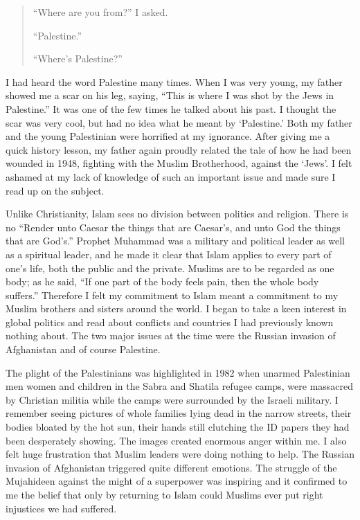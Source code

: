 \documentclass[12pt]{memoir}
\begin{document}
\begin{quote}
“Where are you from?” I asked.

“Palestine.”

“Where’s Palestine?”
\end{quote}

I had heard the word Palestine many times.
When I was very young, my father showed me a scar on his leg, saying,
“This is where I was shot by the Jews in Palestine.”
It was one of the few times he talked about his past.
I thought the scar was very cool,
but had no idea what he meant by ‘Palestine.’
Both my father and the young Palestinian were horrified at my ignorance.
After giving me a quick history lesson,
my father again proudly related the tale of how he had been wounded in 1948,
fighting with the Muslim Brotherhood, against the ‘Jews’.
I felt ashamed at my lack of knowledge of such an important issue
and made sure I read up on the subject.

Unlike Christianity, Islam sees no division between politics and religion.
There is no “Render unto Caesar the things that are Caesar’s,
and unto God the things that are God’s.”
Prophet Muhammad was a military and political leader
as well as a spiritual leader,
and he made it clear that Islam applies to every part of one’s life,
both the public and the private.
Muslims are to be regarded as one body; as he said,
“If one part of the body feels pain, then the whole body suffers.”
Therefore I felt my commitment to Islam meant a commitment
to my Muslim brothers and sisters around the world.
I began to take a keen interest in global politics
and read about conflicts and countries I had previously known nothing about.
The two major issues at the time were the Russian invasion
of Afghanistan and of course Palestine.

The plight of the Palestinians was highlighted in 1982
when unarmed Palestinian men women and children
in the Sabra and Shatila refugee camps,
were massacred by Christian militia while the camps
were surrounded by the Israeli military.
I remember seeing pictures of whole families lying dead in the narrow streets,
their bodies bloated by the hot sun,
their hands still clutching the ID papers they had been desperately showing.
The images created enormous anger within me.
I also felt huge frustration that Muslim leaders were doing nothing to help.
The Russian invasion of Afghanistan triggered quite different emotions.
The struggle of the Mujahideen against the might of a superpower
was inspiring and it confirmed to me the belief
that only by returning to Islam could Muslims
ever put right injustices we had suffered.
\end{document}

